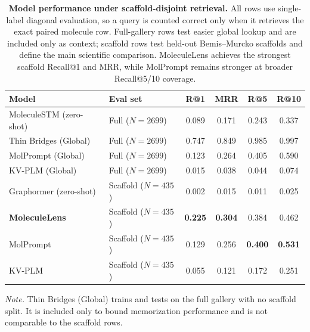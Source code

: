 \documentclass{article}
\begin{document}
\begin{table}[!htbp]
\centering
\small
\caption{\textbf{Model performance under scaffold-disjoint retrieval.} All rows use single-label diagonal evaluation, so a query is counted correct only when it retrieves the exact paired molecule row. Full-gallery rows test easier global lookup and are included only as context; scaffold rows test held-out Bemis--Murcko scaffolds and define the main scientific comparison. MoleculeLens achieves the strongest scaffold Recall@1 and MRR, while MolPrompt remains stronger at broader Recall@5/10 coverage.}
\label{tab:main-results}
\begin{tabular}{l l c c c c}
\toprule
Model & Eval set & R@1 & MRR & R@5 & R@10 \\
\midrule
MoleculeSTM (zero-shot) & Full ($N{=}2699$) & 0.089 & 0.171 & 0.243 & 0.337 \\
Thin Bridges (Global) & Full ($N{=}2699$) & 0.747 & 0.849 & 0.985 & 0.997 \\
MolPrompt (Global) & Full ($N{=}2699$) & 0.123 & 0.264 & 0.405 & 0.590 \\
KV-PLM (Global) & Full ($N{=}2699$) & 0.015 & 0.038 & 0.044 & 0.074 \\
Graphormer (zero-shot) & Scaffold ($N{=}435$) & 0.002 & 0.015 & 0.011 & 0.025 \\
\textbf{MoleculeLens} & Scaffold ($N{=}435$) & \textbf{0.225} & \textbf{0.304} & 0.384 & 0.462 \\
MolPrompt & Scaffold ($N{=}435$) & 0.129 & 0.256 & \textbf{0.400} & \textbf{0.531} \\
KV-PLM & Scaffold ($N{=}435$) & 0.055 & 0.121 & 0.172 & 0.251 \\
\bottomrule
\end{tabular}
\vspace{2pt}
\begin{minipage}{0.98\linewidth}
\footnotesize\textit{Note.} Thin Bridges (Global) trains and tests on the full gallery with no scaffold split. It is included only to bound memorization performance and is not comparable to the scaffold rows.
\end{minipage}
\end{table}
\end{document}
